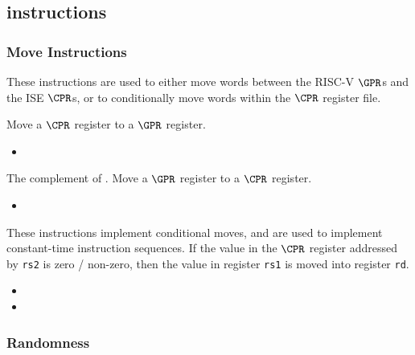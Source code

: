 \subsection{\ISE instructions}
\label{sec:spec:instr}


\subsubsection{Move Instructions}
\label{sec:move-instructions}

These instructions are used to either move words between the RISC-V $\GPR$s
and the ISE $\CPR$s, or to conditionally move words within the $\CPR$
register file.

{\iencmvtwogpr}
{
    Move a $\CPR$ register to a $\GPR$ register.
}
{
\begin{itemize}
\item {}
\end{itemize}
}{
    }

{\iencmvtwocop}
{
The complement of .
Move a $\GPR$ register to a $\CPR$ register.
}{
\begin{itemize}
\item {}
\end{itemize}
}{
}

{\ienccmovcr\ienccmovncr}
{
These instructions implement conditional moves, and are used to implement
constant-time instruction sequences.
If the value in the $\CPR$ register addressed by {\tt rs2} is
zero / non-zero, then the value in register {\tt rs1} is moved
into register {\tt rd}.
}{
\begin{itemize}
\item {}
\item {}
\end{itemize}
}{
}


\subsubsection{Randomness}

